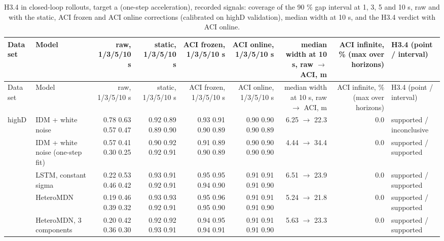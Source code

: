 \begingroup
\footnotesize
\begin{longtable}{llrrrrrrl}
\caption{H3.4 in closed-loop rollouts, target a (one-step acceleration), recorded signals: coverage of the 90 \% gap interval at 1, 3, 5 and 10 s, raw and with the static, ACI frozen and ACI online corrections (calibrated on highD validation), median width at 10 s, and the H3.4 verdict with ACI online.}\label{tab:t4-coverage--raw--a} \\
\toprule
Data set & Model & raw, 1/3/5/10 s & static, 1/3/5/10 s & ACI frozen, 1/3/5/10 s & ACI online, 1/3/5/10 s & median width at 10 s, raw $\rightarrow$ ACI, m & ACI infinite, \% (max over horizons) & H3.4 (point / interval) \\
\midrule
\endfirsthead
\toprule
Data set & Model & raw, 1/3/5/10 s & static, 1/3/5/10 s & ACI frozen, 1/3/5/10 s & ACI online, 1/3/5/10 s & median width at 10 s, raw $\rightarrow$ ACI, m & ACI infinite, \% (max over horizons) & H3.4 (point / interval) \\
\midrule
\endhead
\bottomrule
\endlastfoot
highD & IDM + white noise & 0.78 0.63 0.57 0.47 & 0.92 0.89 0.89 0.90 & 0.93 0.91 0.90 0.89 & 0.90 0.90 0.90 0.89 & 6.25 $\rightarrow$ 22.3 & 0.0 & supported / inconclusive \\
 & IDM + white noise (one-step fit) & 0.57 0.41 0.30 0.25 & 0.90 0.92 0.92 0.91 & 0.91 0.89 0.90 0.89 & 0.90 0.90 0.90 0.90 & 4.44 $\rightarrow$ 34.4 & 0.0 & supported / supported \\
 & LSTM, constant sigma & 0.22 0.53 0.46 0.42 & 0.93 0.91 0.92 0.91 & 0.95 0.95 0.94 0.90 & 0.91 0.91 0.91 0.90 & 6.51 $\rightarrow$ 23.9 & 0.0 & supported / supported \\
 & HeteroMDN & 0.19 0.46 0.39 0.32 & 0.93 0.93 0.92 0.91 & 0.95 0.96 0.95 0.90 & 0.91 0.91 0.91 0.90 & 5.24 $\rightarrow$ 21.8 & 0.0 & supported / supported \\
 & HeteroMDN, 3 components & 0.20 0.42 0.36 0.30 & 0.92 0.92 0.93 0.91 & 0.94 0.95 0.94 0.91 & 0.91 0.91 0.91 0.90 & 5.63 $\rightarrow$ 23.3 & 0.0 & supported / supported \\

\end{longtable}
